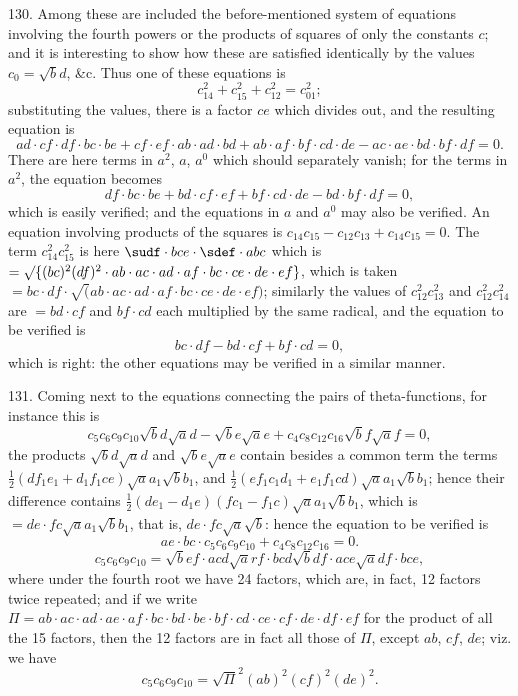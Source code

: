 \documentclass[11pt,a4paper]{book}
\begin{document}
130. Among these are included the before-mentioned system of equations involving the fourth powers or the products of squares of only the constants $c$; and it is interesting to show how these are satisfied identically by the values $c_0 = \surd bd$, \&c. Thus one of these equations is
\[
c_{14}^2 + c_{15}^2 + c_{12}^2 = c_{01}^2;
\]
substituting the values, there is a factor $ce$ which divides out, and the resulting equation is
\[
ad \cdot cf \cdot df \cdot bc \cdot be + cf \cdot ef \cdot ab \cdot ad \cdot bd + ab \cdot af \cdot bf \cdot cd \cdot de - ac \cdot ae \cdot bd \cdot bf \cdot df = 0.
\]
There are here terms in $a^2$, $a$, $a^0$ which should separately vanish; for the terms in $a^2$, the equation becomes
\[
df \cdot bc \cdot be + bd \cdot cf \cdot ef + bf \cdot cd \cdot de - bd \cdot bf \cdot df = 0,
\]
which is easily verified; and the equations in $a$ and $a^0$ may also be verified. An equation involving products of the squares is $c_{14}c_{15} - c_{12}c_{13} + c_{14}c_{15} = 0$. The term $c_{14}^2 c_{15}^2$ is here $\sudf \cdot bce \cdot \sdef \cdot abc$ which is $= \surd\{(bc)^2 (df)^2 \cdot ab \cdot ac \cdot ad \cdot af \cdot bc \cdot ce \cdot de \cdot ef\}$, which is taken $= bc \cdot df \cdot \surd(ab \cdot ac \cdot ad \cdot af \cdot bc \cdot ce \cdot de \cdot ef)$; similarly the values of $c_{12}^2 c_{13}^2$ and $c_{12}^2 c_{14}^2$ are $= bd \cdot cf$ and $bf \cdot cd$ each multiplied by the same radical, and the equation to be verified is
\[
bc \cdot df - bd \cdot cf + bf \cdot cd = 0,
\]
which is right: the other equations may be verified in a similar manner.

131. Coming next to the equations connecting the pairs of theta-functions, for instance this is
\[
c_5 c_6 c_9 c_{10} \surd bd \surd ad - \surd be \surd ae + c_4 c_8 c_{12} c_{16} \surd bf \surd af = 0,
\]
the products $\surd bd \surd ad$ and $\surd be \surd ae$ contain besides a common term the terms $\tfrac12 (df_1 e_1 + d_1 f_1 ce) \surd aa_1 \surd bb_1$, and $\tfrac12 (ef_1 c_1 d_1 + e_1 f_1 cd) \surd aa_1 \surd bb_1$; hence their difference contains $\tfrac12 (de_1 - d_1 e)(fc_1 - f_1 c) \surd aa_1 \surd bb_1$, which is $= de \cdot fc \surd aa_1 \surd bb_1$, that is, $de \cdot fc \surd a \surd b$: hence the equation to be verified is
\[
ae \cdot bc \cdot c_5 c_6 c_9 c_{10} + c_4 c_8 c_{12} c_{16} = 0.
\]
\[
c_5 c_6 c_9 c_{10} = \surd bef \cdot acd \surd arf \cdot bcd \surd bdf \cdot ace \surd adf \cdot bce,
\]
where under the fourth root we have 24 factors, which are, in fact, 12 factors twice repeated; and if we write $\Pi = ab \cdot ac \cdot ad \cdot ae \cdot af \cdot bc \cdot bd \cdot be \cdot bf \cdot cd \cdot ce \cdot cf \cdot de \cdot df \cdot ef$ for the product of all the 15 factors, then the 12 factors are in fact all those of $\Pi$, except $ab$, $cf$, $de$; viz. we have
\[
c_5 c_6 c_9 c_{10} = \surd\Pi^2 (ab)^2 (cf)^2 (de)^2.
\]
\end{document}
